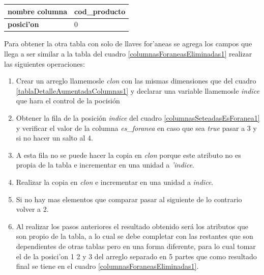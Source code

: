 
\begin{center}
  \label{columnasForaneasEliminadas1} %
  \begin{tabular}{|l|l|}
  \hline 
  \textbf{nombre columna} & cod\_producto \\ \hline
  \textbf{posici'on}      & 0             \\ \hline
  \end{tabular}
\end{center}
Para obtener la otra tabla con solo de llaves for'aneas se agrega los campos que llega a ser similar a la tabla del cuadro \ref{columnasForaneasEliminadas1} realizar las siguientes operaciones:
 \begin{enumerate}
 \item Crear un arreglo llamemosle \textit{clon} con las mismas dimensiones que del cuadro \ref{tablaDetalleAumentadaColumnas1} y declarar una variable llamemosle \textit{indice} que hara el control de la pocisi\'on  
 \item Obtener la fila de la posici\'on \textit{indice} del cuadro \ref{columnasSeteadasEsForanea1} y verificar el valor de la columna \textit{es\_foranea} en caso que sea \textit{true} pasar a 3 y si no hacer un salto al 4.
 \item A esta fila no se puede hacer la copia en \textit{clon} porque este atributo no es propia de la tabla e incrementar en una unidad a \textit{'indice}.
 \item Realizar la copia en \textit{clon} e incrementar en una unidad a \textit{indice}.
 \item Si no hay mas elementos que comparar pasar al siguiente de lo contrario volver a 2.
 \item Al realizar los pasos anteriores el resultado obtenido ser\'a los atributos que son propio de la tabla, a lo cual se debe completar con las restantes que son dependientes de otras tablas pero en una forma diferente, para lo cual tomar el de la posici'on 1 2 y 3 del arreglo separado en 5 partes que como resultado final se tiene en el cuadro \ref{columnasForaneasEliminadas1}.
 \end{enumerate}
